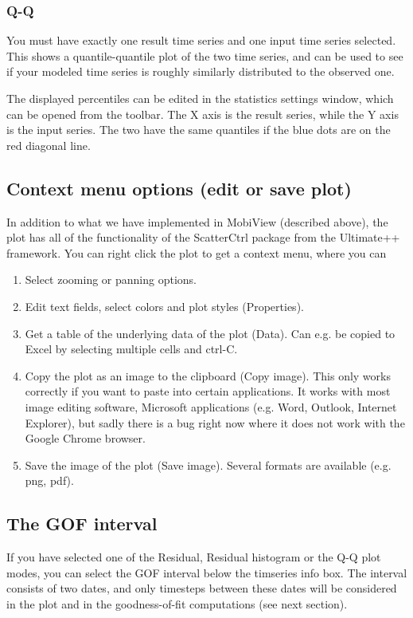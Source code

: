 \documentclass[11pt]{article}
\theoremstyle{definition}
\begin{document}
\subsubsection{Q-Q}

You must have exactly one result time series and one input time series selected. This shows a quantile-quantile plot of the two time series, and can be used to see if your modeled time series is roughly similarly distributed to the observed one.

The displayed percentiles can be edited in the statistics settings window, which can be opened from the toolbar. The X axis is the result series, while the Y axis is the input series. The two have the same quantiles if the blue dots are on the red diagonal line.

\subsection{Context menu options (edit or save plot)}

In addition to what we have implemented in MobiView (described above), the plot has all of the functionality of the ScatterCtrl package from the Ultimate++ framework. You can right click the plot to get a context menu, where you can
\begin{enumerate}[i]
\item Select zooming or panning options.
\item Edit text fields, select colors and plot styles (Properties).
\item Get a table of the underlying data of the plot (Data). Can e.g. be copied to Excel by selecting multiple cells and ctrl-C.
\item Copy the plot as an image to the clipboard (Copy image). This only works correctly if you want to paste into certain applications. It works with most image editing software, Microsoft applications (e.g. Word, Outlook, Internet Explorer), but sadly there is a bug right now where it does not work with the Google Chrome browser.
\item Save the image of the plot (Save image). Several formats are available (e.g. png, pdf).
\end{enumerate}

\subsection{The GOF interval}\label{sec:gofint}

If you have selected one of the Residual, Residual histogram or the Q-Q plot modes, you can select the GOF interval below the timseries info box. The interval consists of two dates, and only timesteps between these dates will be considered in the plot and in the goodness-of-fit computations (see next section).
\end{document}
